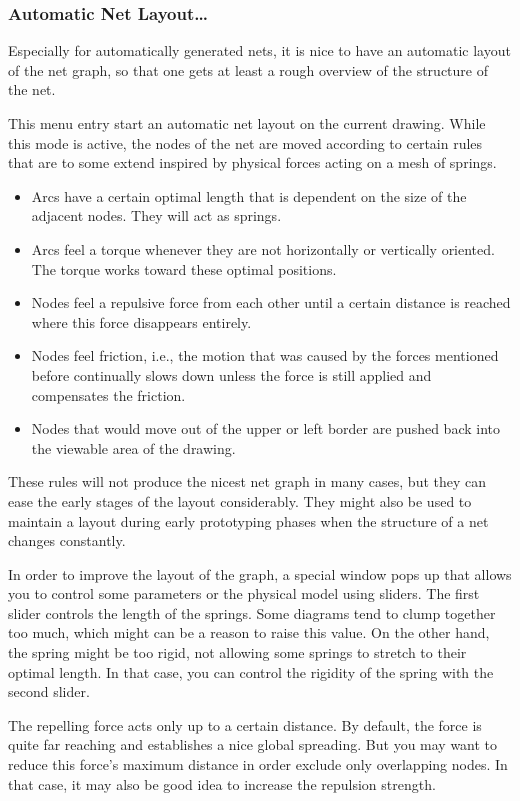 \subsubsection{Automatic Net Layout\dots}

Especially for automatically generated nets, it is nice to
have an automatic layout of the net graph, so that one gets
at least a rough overview of the structure of the net.

This menu entry start an automatic net layout on the
current drawing.
While this mode is active, the nodes of the net are moved according
to certain rules that are to some extend inspired by
physical forces acting on a mesh of springs.
\begin{itemize}
\item Arcs have a certain optimal length that is dependent
  on the size of the adjacent nodes. They will act as springs.
\item Arcs feel a torque whenever they are not horizontally
  or vertically oriented. The torque works toward these optimal
  positions.
\item Nodes feel a repulsive force from each other until
  a certain distance is reached where this force disappears entirely.
\item Nodes feel friction, i.e., the motion that was caused
  by the forces mentioned before continually slows down unless the force
  is still applied and compensates the friction.
\item Nodes that would move out of the upper or left border
  are pushed back into the viewable area of the drawing.
\end{itemize}
These rules will not produce the nicest net graph in many cases,
but they can ease the early stages of the layout considerably.
They might also be used to maintain a layout during early prototyping
phases when the structure of a net changes constantly.

In order to improve the layout of the graph, a special window
pops up that allows you to control some parameters or the physical model
using sliders. The first slider controls the length of the
springs. Some diagrams tend to clump together too much, which might
can be a reason to raise this value. On the other hand, the
spring might be too rigid, not allowing some springs to stretch to
their optimal length. In that case, you can control the rigidity of
the spring with the second slider.

The repelling force acts only up to a certain distance.
By default, the force is quite far reaching and establishes
a nice global spreading. But you may want to reduce this force's
maximum distance in order exclude only overlapping nodes.
In that case, it may also be good idea to increase the repulsion strength.

